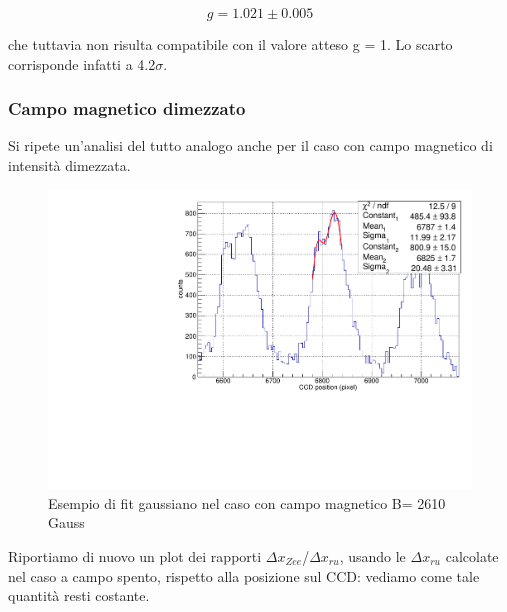 \documentclass{article}
\begin{document}
	\[
		g = 1.021 \pm 0.005	
	\]
	
	che tuttavia non risulta compatibile con il valore atteso g = 1.
	Lo scarto corrisponde infatti a 4.2$\sigma$.  

	 
	\subsubsection*{Campo magnetico dimezzato}

	Si ripete un'analisi del tutto analogo anche per il caso con campo magnetico di intensità dimezzata.
	
	
	\begin{center}
	\begin{figure}[H]
		\centering
		\includegraphics[scale=0.38, angle=0]{campomin/singolo.pdf}
		\caption{ Esempio di fit gaussiano nel caso con campo magnetico B= 2610 Gauss}
		\label{fig:singoloBonMin}
	\end{figure}
	\end{center}

	Riportiamo di nuovo un plot dei rapporti $\Delta x_{Zee}$/$\Delta x_{ru}$, usando le $\Delta x_{ru}$
	calcolate nel caso a campo spento, rispetto alla posizione sul CCD: vediamo come tale quantità resti 
	costante.
\end{document}
